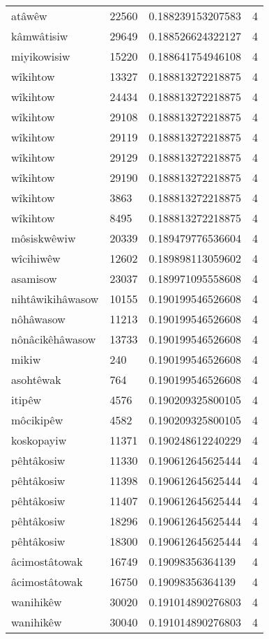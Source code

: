 \begin{longtable}{llll}
atâwêw & 22560 & 0.188239153207583 & 4 \\
kâmwâtisiw & 29649 & 0.188526624322127 & 4 \\
miyikowisiw & 15220 & 0.188641754946108 & 4 \\
wîkihtow & 13327 & 0.188813272218875 & 4 \\
wîkihtow & 24434 & 0.188813272218875 & 4 \\
wîkihtow & 29108 & 0.188813272218875 & 4 \\
wîkihtow & 29119 & 0.188813272218875 & 4 \\
wîkihtow & 29129 & 0.188813272218875 & 4 \\
wîkihtow & 29190 & 0.188813272218875 & 4 \\
wîkihtow & 3863 & 0.188813272218875 & 4 \\
wîkihtow & 8495 & 0.188813272218875 & 4 \\
môsiskwêwiw & 20339 & 0.189479776536604 & 4 \\
wîcihiwêw & 12602 & 0.189898113059602 & 4 \\
asamisow & 23037 & 0.189971095558608 & 4 \\
nihtâwikihâwasow & 10155 & 0.190199546526608 & 4 \\
nôhâwasow & 11213 & 0.190199546526608 & 4 \\
nônâcikêhâwasow & 13733 & 0.190199546526608 & 4 \\
mikiw & 240 & 0.190199546526608 & 4 \\
asohtêwak & 764 & 0.190199546526608 & 4 \\
itipêw & 4576 & 0.190209325800105 & 4 \\
môcikipêw & 4582 & 0.190209325800105 & 4 \\
koskopayiw & 11371 & 0.190248612240229 & 4 \\
pêhtâkosiw & 11330 & 0.190612645625444 & 4 \\
pêhtâkosiw & 11398 & 0.190612645625444 & 4 \\
pêhtâkosiw & 11407 & 0.190612645625444 & 4 \\
pêhtâkosiw & 18296 & 0.190612645625444 & 4 \\
pêhtâkosiw & 18300 & 0.190612645625444 & 4 \\
âcimostâtowak & 16749 & 0.19098356364139 & 4 \\
âcimostâtowak & 16750 & 0.19098356364139 & 4 \\
wanihikêw & 30020 & 0.191014890276803 & 4 \\
wanihikêw & 30040 & 0.191014890276803 & 4 \\

\end{longtable}
